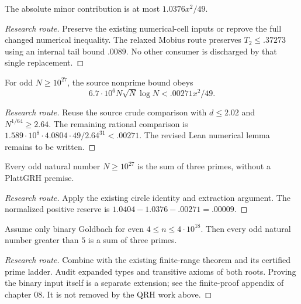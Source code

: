 \begin{theorem}\label{minor}\notready
The absolute minor contribution is at most $1.0376x^2/49$.
\end{theorem}
\begin{proof}[Research route]
Preserve the existing numerical-cell inputs or reprove the full changed
numerical inequality. The relaxed Mobius route preserves $T_2\le.37273$
using an internal tail bound $.0089$. No other consumer is discharged by
that single replacement.
\end{proof}

\begin{theorem}\label{nonprime}\notready
For odd $N\ge10^{27}$, the source nonprime bound obeys
\[6.7\cdot10^6N\sqrt N\log N<.00271x^2/49.\]
\end{theorem}
\begin{proof}[Research route]
Reuse the source crude comparison with $d\le2.02$ and $N^{1/64}\ge2.64$.
The remaining rational comparison is
$1.589\cdot10^8\cdot4.0804\cdot49/2.64^{31}<.00271$.
The revised Lean numerical lemma remains to be written.
\end{proof}

\begin{theorem}\label{large}\notready
Every odd natural number $N\ge10^{27}$ is the sum of three primes,
without a PlattGRH premise.
\end{theorem}
\begin{proof}[Research route]
Apply the existing circle identity and extraction argument. The normalized
positive reserve is $1.0404-1.0376-.00271=.00009$.
\end{proof}

\begin{theorem}\label{full}\notready
Assume only binary Goldbach for even $4\le n\le4\cdot10^{18}$.
Then every odd natural number greater than $5$ is a sum of three primes.
\end{theorem}
\begin{proof}[Research route]
Combine with the existing finite-range theorem and its certified prime
ladder. Audit expanded types and transitive axioms of both roots. Proving
the binary input itself is a separate extension; see the finite-proof
appendix of chapter 08. It is not removed by the QRH work above.
\end{proof}
